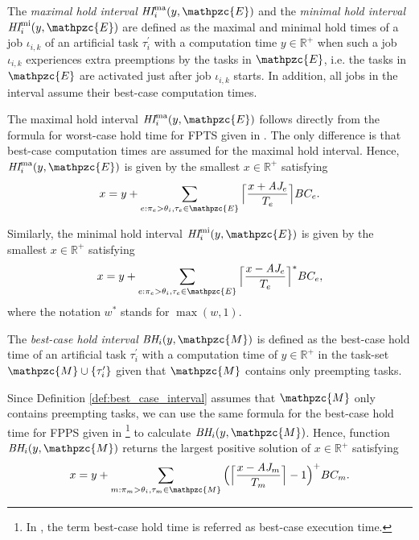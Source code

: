 \begin{definition}
The \textit{maximal hold interval} $\hi^{\rm{ma}}_i(y,\mathpzc{E})$ and the \textit{minimal hold interval} $\hi^{\rm{mi}}_i(y,\mathpzc{E})$ are defined as the maximal and minimal hold times of a job $\iota_{i,k}$ of an artificial task $\tau^{\prime}_i$ with a computation time $y \in \mathbb{R}^+$ when such a job $\iota_{i,k}$ experiences extra preemptions by the tasks in $\mathpzc{E}$, i.e. the tasks in  $\mathpzc{E}$ are activated just after job $\iota_{i,k}$ starts. In addition, all jobs in the interval assume their best-case computation times.
\end{definition}

The {maximal hold interval} $\hi^{\rm{ma}}_i(y,\mathpzc{E})$ follows directly from the formula for {worst-case hold time} for FPTS given in \cite{BAHDB17}. The only difference is that best-case computation times are assumed for the {maximal hold interval}. Hence, $\hi^{\rm{ma}}_i(y,\mathpzc{E})$ is given by the smallest $x \in \mathbb{R}^+$ satisfying
\begin{align}
x = y + \sum\limits_{e:\pi_e > \theta_i, \tau_e \in \mathpzc{E}}\Big\lceil  \dfrac{x+ \aj_e}{T_e}\Big\rceil  BC_e.
\end{align}

Similarly, the {minimal hold interval} $\hi^{\rm{mi}}_i(y,\mathpzc{E})$ is given by the smallest $x \in \mathbb{R}^+$ satisfying
\begin{align}
x = y + \sum\limits_{e:\pi_e > \theta_i, \tau_e \in \mathpzc{E}}\Big\lceil  \dfrac{x- \aj_e}{T_e}\Big\rceil^{*}  BC_e,
\end{align}
where the notation $w^*$ stands for $\max(w,1)$.

\begin{definition} \label{def:best_case_interval}
	The \textit{best-case hold interval} $\bh_i(y,\mathpzc{M})$ is defined as the best-case hold time of an artificial task $\tau^{\prime}_i$ with a computation time of $y \in \mathbb{R}^+$ in the task-set $\mathpzc{M}\cup \{\tau^{\prime}_i\}$ given that $\mathpzc{M}$ contains only preempting tasks.
\end{definition}

Since Definition \ref{def:best_case_interval} assumes that $\mathpzc{M}$ only contains preempting tasks, we can use the same formula for the best-case hold time for FPPS given in \cite{BFV08}\footnote{In \cite{BFV08}, the term best-case hold time is referred as best-case execution time.} to calculate $\bh_i(y,\mathpzc{M})$. Hence, function $\bh_i(y,\mathpzc{M})$ returns the largest positive solution of $x \in \mathbb{R}^+$ satisfying
\begin{align} \label{eqn:best_case_hold_interval}
x = y + \sum\limits_{m:\pi_m > \theta_i, \tau_m \in \mathpzc{M}} \Big( \Big\lceil  \dfrac{x-\aj_m}{T_m}\Big\rceil -1 \Big)^+  BC_m.
\end{align}


